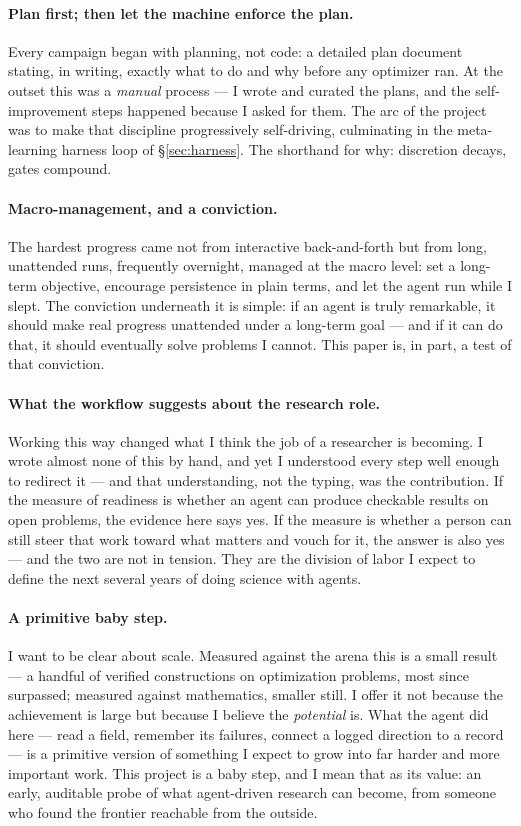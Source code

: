\documentclass[11pt]{article}
\begin{document}
\paragraph{Plan first; then let the machine enforce the plan.}
Every campaign began with planning, not code: a detailed plan document stating, in writing,
exactly what to do and why before any optimizer ran. At the outset this was a \emph{manual}
process --- I wrote and curated the plans, and the self-improvement steps happened because I
asked for them. The arc of the project was to make that discipline progressively
self-driving, culminating in the meta-learning harness loop of \S\ref{sec:harness}. The
shorthand for why: discretion decays, gates compound.

\paragraph{Macro-management, and a conviction.}
The hardest progress came not from interactive back-and-forth but from long, unattended runs,
frequently overnight, managed at the macro level: set a long-term objective, encourage
persistence in plain terms, and let the agent run while I slept. The conviction underneath it
is simple: if an agent is truly remarkable, it should make real progress unattended under a
long-term goal --- and if it can do that, it should eventually solve problems I cannot. This
paper is, in part, a test of that conviction.

\paragraph{What the workflow suggests about the research role.}
Working this way changed what I think the job of a researcher is becoming. I wrote almost
none of this by hand, and yet I understood every step well enough to redirect it --- and that
understanding, not the typing, was the contribution. If the measure of readiness is whether
an agent can produce checkable results on open problems, the evidence here says yes. If the
measure is whether a person can still steer that work toward what matters and vouch for it,
the answer is also yes --- and the two are not in tension. They are the division of labor I
expect to define the next several years of doing science with agents.

\paragraph{A primitive baby step.}
I want to be clear about scale. Measured against the arena this is a small result --- a handful of
verified constructions on optimization problems, most since surpassed; measured against mathematics,
smaller still. I offer it not because the achievement is large but because I believe the
\emph{potential} is. What the agent did here --- read a field, remember its failures, connect a
logged direction to a record --- is a primitive version of something I expect to grow into far
harder and more important work. This project is a baby step, and I mean that as its value: an early,
auditable probe of what agent-driven research can become, from someone who found the frontier
reachable from the outside.




\end{document}
